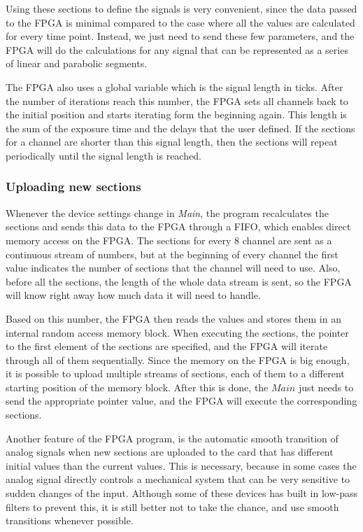 \documentclass{tdk_style}
\begin{document}
Using these sections to define the signals is very convenient, since the data passed to the FPGA is minimal compared to the case where all the values are calculated for every time point. Instead, we just need to send these few parameters, and the FPGA will do the calculations for any signal that can be represented as a series of linear and parabolic segments.

The FPGA also uses a global variable which is the signal length in ticks. After the number of iterations reach this number, the FPGA sets all channels back to the initial position and starts iterating form the beginning again. This length is the sum of the exposure time and the delays that the user defined. If the sections for a channel are shorter than this signal length, then the sections will repeat periodically until the signal length is reached.

\subsubsection{Uploading new sections}

Whenever the device settings change in \emph{Main}, the program recalculates the sections and sends this data to the FPGA through a FIFO, which enables direct memory access on the FPGA. The sections for every 8 channel are sent as a continuous stream of numbers, but at the beginning of every channel the first value indicates the number of sections that the channel will need to use. Also, before all the sections, the length of the whole data stream is sent, so the FPGA will know right away how much data it will need to handle.

Based on this number, the FPGA then reads the values and stores them in an internal random access memory block. When executing the sections, the pointer to the first element of the sections are specified, and the FPGA will iterate through all of them sequentially. Since the memory on the FPGA is big enough, it is possible to upload multiple streams of sections, each of them to a different starting position of the memory block. After this is done, the $Main$ just needs to send the appropriate pointer value, and the FPGA will execute the corresponding sections.

Another feature of the FPGA program, is the automatic smooth transition of analog signals when new sections are uploaded to the card that has different initial values than the current values. This is necessary, because in some cases the analog signal directly controls a mechanical system that can be very sensitive to sudden changes of the input. Although some of these devices has built in low-pass filters to prevent this, it is still better not to take the chance, and use smooth transitions whenever possible. 
\end{document}
